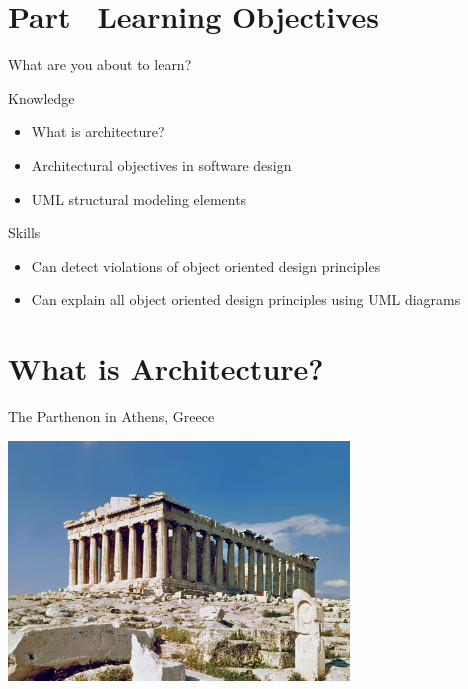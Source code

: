 %
%
\section{Part \partNo\ Learning Objectives}

\begin{frame}{What are you about to learn?}
   \begin{block}{Knowledge}
       \begin{itemize}
           \item What is architecture?
           \item Architectural objectives in software design
           \item UML structural modeling elements 
   \end{itemize}
   \end{block}
   \begin{block}{Skills}
       \begin{itemize}
           \item Can detect violations of object oriented design principles
           \item Can explain all object oriented design principles using UML diagrams
   \end{itemize}
\end{block}
\end{frame}

\section{What is Architecture?}

\begin{frame}[fragile]{The Parthenon in Athens, Greece}
\begin{center}
  \includegraphics[height=180pt]{partenon.jpg}
\end{center}
\end{frame}

